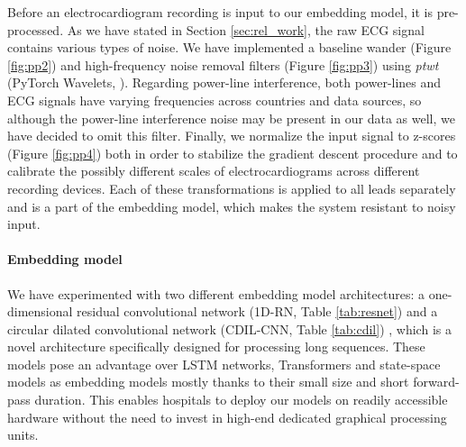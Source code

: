 \documentclass[preprint,12pt]{elsarticle}
\begin{document}
Before an electrocardiogram recording is input to our embedding model, it is pre-processed. As we have stated in Section \ref{sec:rel_work}, the raw ECG signal contains various types of noise. We have implemented a baseline wander (Figure \ref{fig:pp2}) and high-frequency noise removal filters (Figure \ref{fig:pp3}) using \textit{ptwt} (PyTorch Wavelets, \cite{Blanke2021}). Regarding power-line interference, both power-lines and ECG signals have varying frequencies across countries and data sources, so although the power-line interference noise may be present in our data as well, we have decided to omit this filter. Finally, we normalize the input signal to z-scores (Figure \ref{fig:pp4}) both in order to stabilize the gradient descent procedure and to calibrate the possibly different scales of electrocardiograms across different recording devices. Each of these transformations is applied to all leads separately and is a part of the embedding model, which makes the system resistant to noisy input.

\paragraph{Embedding model}

We have experimented with two different embedding model architectures: a one-dimensional residual convolutional network (1D-RN, Table \ref{tab:resnet}) \cite{he2016deep} and a circular dilated convolutional network (CDIL-CNN, Table \ref{tab:cdil}) \cite{cheng2023classification}, which is a novel architecture specifically designed for processing long sequences. These models pose an advantage over LSTM networks, Transformers \cite{vaswani2017attention} and state-space models \cite{smith2022simplified} as embedding models mostly thanks to their small size and short forward-pass duration. This enables hospitals to deploy our models on readily accessible hardware without the need to invest in high-end dedicated graphical processing units.
\end{document}
